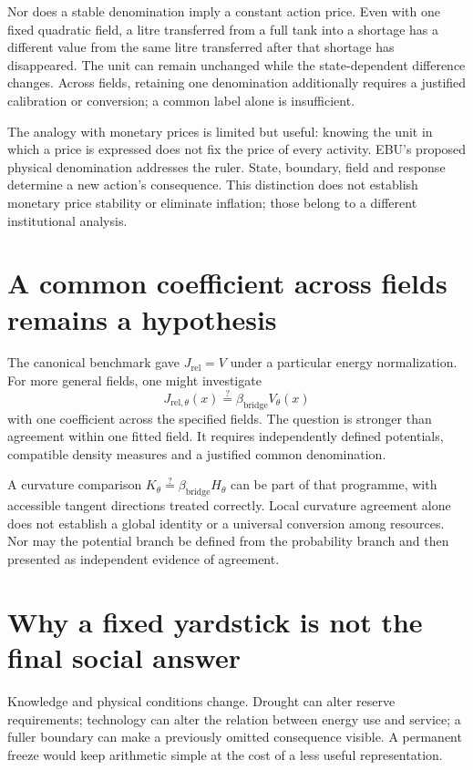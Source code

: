 Nor does a stable denomination imply a constant action price. Even with one fixed quadratic field, a litre transferred from a full tank into a shortage has a different value from the same litre transferred after that shortage has disappeared. The unit can remain unchanged while the state-dependent difference changes. Across fields, retaining one denomination additionally requires a justified calibration or conversion; a common label alone is insufficient.

The analogy with monetary prices is limited but useful: knowing the unit in which a price is expressed does not fix the price of every activity. EBU's proposed physical denomination addresses the ruler. State, boundary, field and response determine a new action's consequence. This distinction does not establish monetary price stability or eliminate inflation; those belong to a different institutional analysis.

\section{A common coefficient across fields remains a hypothesis}
The canonical benchmark gave $J_{\mathrm{rel}}=V$ under a particular energy normalization. For more general fields, one might investigate
\begin{equation}
 J_{{\mathrm{rel}},\theta}(x)\overset{?}{=}
 \beta_{\mathrm{bridge}}V_\theta(x)
\end{equation}
with one coefficient across the specified fields. The question is stronger than agreement within one fitted field. It requires independently defined potentials, compatible density measures and a justified common denomination.

A curvature comparison $K_\theta\overset{?}{=}\beta_{\mathrm{bridge}}H_\theta$ can be part of that programme, with accessible tangent directions treated correctly. Local curvature agreement alone does not establish a global identity or a universal conversion among resources. Nor may the potential branch be defined from the probability branch and then presented as independent evidence of agreement.

\section{Why a fixed yardstick is not the final social answer}
Knowledge and physical conditions change. Drought can alter reserve requirements; technology can alter the relation between energy use and service; a fuller boundary can make a previously omitted consequence visible. A permanent freeze would keep arithmetic simple at the cost of a less useful representation.


